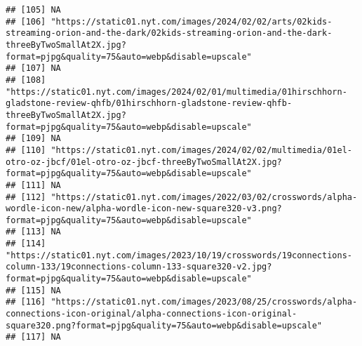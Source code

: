 \documentclass[
]{article}
\begin{document}
\begin{verbatim}
## [105] NA                                                                                                                                                                                                    
## [106] "https://static01.nyt.com/images/2024/02/02/arts/02kids-streaming-orion-and-the-dark/02kids-streaming-orion-and-the-dark-threeByTwoSmallAt2X.jpg?format=pjpg&quality=75&auto=webp&disable=upscale"    
## [107] NA                                                                                                                                                                                                    
## [108] "https://static01.nyt.com/images/2024/02/01/multimedia/01hirschhorn-gladstone-review-qhfb/01hirschhorn-gladstone-review-qhfb-threeByTwoSmallAt2X.jpg?format=pjpg&quality=75&auto=webp&disable=upscale"
## [109] NA                                                                                                                                                                                                    
## [110] "https://static01.nyt.com/images/2024/02/02/multimedia/01el-otro-oz-jbcf/01el-otro-oz-jbcf-threeByTwoSmallAt2X.jpg?format=pjpg&quality=75&auto=webp&disable=upscale"                                  
## [111] NA                                                                                                                                                                                                    
## [112] "https://static01.nyt.com/images/2022/03/02/crosswords/alpha-wordle-icon-new/alpha-wordle-icon-new-square320-v3.png?format=pjpg&quality=75&auto=webp&disable=upscale"                                 
## [113] NA                                                                                                                                                                                                    
## [114] "https://static01.nyt.com/images/2023/10/19/crosswords/19connections-column-133/19connections-column-133-square320-v2.jpg?format=pjpg&quality=75&auto=webp&disable=upscale"                           
## [115] NA                                                                                                                                                                                                    
## [116] "https://static01.nyt.com/images/2023/08/25/crosswords/alpha-connections-icon-original/alpha-connections-icon-original-square320.png?format=pjpg&quality=75&auto=webp&disable=upscale"                
## [117] NA                                                                                                                                                                                                    

\end{verbatim}
\end{document}
